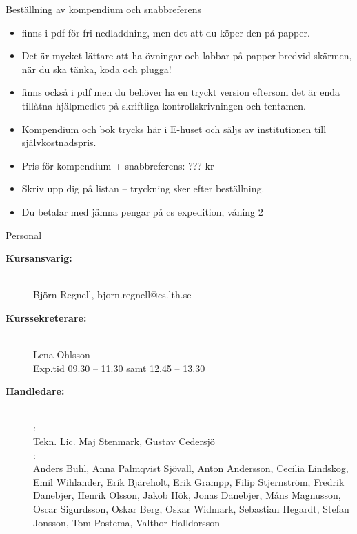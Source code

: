 \else
\begin{Slide}{Beställning av kompendium och snabbreferens}
\begin{itemize}
\item {} finns i pdf för fri nedladdning, men det  att du köper den på papper.
\item Det är mycket lättare att ha övningar och labbar på papper bredvid skärmen, när du ska tänka, koda och plugga!
\item {} finns också i pdf men du behöver ha en tryckt version eftersom det är enda tillåtna hjälpmedlet på skriftliga kontrollskrivningen och tentamen.
\item Kompendium och bok trycks här i E-huset och säljs av institutionen till självkostnadspris.
\item Pris för kompendium + snabbreferens: ??? kr
\item Skriv upp dig på listan -- tryckning sker efter beställning.
\item Du betalar med jämna pengar på cs expedition, våning 2
\end{itemize}
\end{Slide}
\fi

\ifkompendium\else
\begin{Slide}{Personal}\SlideFontSmall
\begin{description}
\item [\bfseries Kursansvarig:] ~\\Björn Regnell, bjorn.regnell@cs.lth.se
\item [\bfseries Kurssekreterare:]  ~\\Lena Ohlsson \\Exp.tid 09.30 -- 11.30 samt 12.45 -- 13.30
\item [\bfseries Handledare:] ~\\
: \\ 
Tekn. Lic. Maj Stenmark, Gustav Cedersjö\\
: \\
Anders Buhl, 
Anna Palmqvist Sjövall, 
Anton Andersson,
Cecilia Lindskog, 
Emil Wihlander, 
Erik Bjäreholt, 
Erik Grampp, 
Filip Stjernström, 
Fredrik Danebjer, 
Henrik Olsson, 
Jakob Hök, 
Jonas Danebjer, 
Måns Magnusson, 
Oscar Sigurdsson, 
Oskar Berg, 
Oskar Widmark, 
Sebastian Hegardt, 
Stefan Jonsson, 
Tom Postema, 
Valthor Halldorsson
\end{description}
\end{Slide}
\fi

